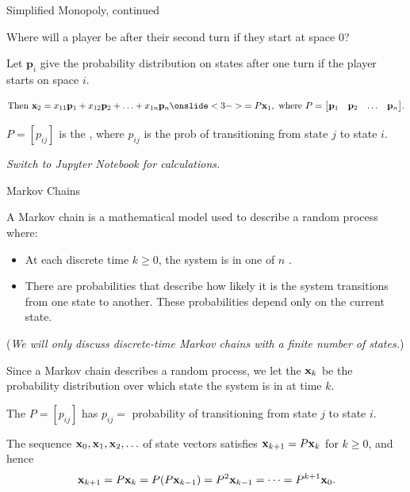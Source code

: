 \documentclass[xcolor=dvipsnames,aspectratio=169,t]{beamer}
\renewcommand{\p}{\ensuremath{\mathbf{p}}}
\begin{document}
\begin{frame}{Simplified Monopoly, continued}
  \medskip

  Where will a player be after their \alert{second turn} if they start at space $0$?
  \medskip
  
  \pause
  Let $\p_i$ give the probability distribution on states after one turn if the player \alert{starts} on space $i$.
  
  \[
    \text{Then }
    \x_2 = x_{11} \p_1 + x_{12} \p_2 + \ldots + x_{1n} \p_n
    \onslide<3->{= P \x_1, 
    \text{ where $P=\begin{bmatrix}\p_1 & \p_2 & \ldots & \p_n \end{bmatrix}$.}}
  \]
  \vspace*{-.75em}
  
  \pause
  $P=[p_{ij}]$ is the , where $p_{ij}$ is the prob of transitioning from \alert{state $j$} to \alert{state $i$}.
  \bigskip
  
  \pause
  \emph{Switch to Jupyter Notebook for calculations.}
  \bigskip

\end{frame}


\begin{frame}{Markov Chains}
  
  \begin{definition}
    A \alert{Markov chain} is a mathematical model used to describe a random process where:
    \begin{itemize}
      \item At each discrete time $k\ge 0$, the system is in one of $n$ .
      \item There are probabilities that describe how likely it is the system transitions from one state to another.
      These probabilities depend \alert{only} on the \alert{current state}.
    \end{itemize}
    {\small (\emph{We will only discuss discrete-time Markov chains with a finite number of states.})}
  \end{definition}
  \smallskip
  
  \pause
  Since a Markov chain describes a random process, we let the  $\mathbf{x}_k$ be the probability distribution over which state the system is in at time $k$.
  \medskip
  
  The  $P=[p_{ij}]$ has $p_{ij}=$ probability of transitioning from \alert{state $j$} to \alert{state $i$}.
  \medskip
  
  \pause
  The sequence $\mathbf{x}_0,\mathbf{x}_1,\mathbf{x}_2,\ldots$ of state vectors satisfies $\mathbf{x}_{k+1}=P\mathbf{x}_k$ for $k\ge 0$, 
  \pause
  and hence 
  \[ \mathbf{x}_{k+1} = P\mathbf{x}_k = P (P \mathbf{x}_{k-1}) = P^2 \mathbf{x}_{k-1} = \cdots = P^{k+1} \mathbf{x}_0. \]
\end{frame}
\end{document}
